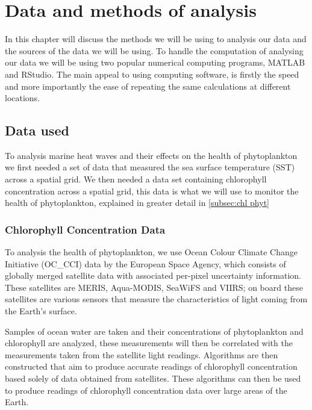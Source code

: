 {\let\clearpage\relax \chapter{Data and methods of analysis}}

In this chapter will discuss the methods we will be using to analysis our data and the sources of the data we will be using. To handle the computation of analysing our data we will be using two popular numerical computing programs, \textsc{MATLAB} and RStudio. The main appeal to using computing software, is firstly the speed and more importantly the ease of repeating the same calculations at different locations.

\section{Data used}

To analysis marine heat waves and their effects on the health of phytoplankton we first needed a set of data that measured the sea surface temperature (SST) across a spatial grid. We then needed a data set containing chlorophyll concentration across a spatial grid, this data is what we will use to monitor the health of phytoplankton, explained in greater detail in \autoref{subsec:chl phyt}

\subsection{Chlorophyll Concentration Data}

To analysis the health of phytoplankton, we use Ocean Colour Climate Change Initiative (OC\_CCI) \cite{ESA} data by the European Space Agency, which consists of globally merged satellite data with associated per-pixel uncertainty information. These satellites are MERIS, Aqua-MODIS, SeaWiFS and VIIRS; on board these satellites are various sensors that measure the characteristics of light coming from the Earth's surface.

Samples of ocean water are taken and their concentrations of phytoplankton and chlorophyll are analyzed, these measurements will then be correlated with the measurements taken from the satellite light readings. Algorithms are then constructed that aim to produce accurate readings of chlorophyll concentration based solely of data obtained from satellites. These algorithms can then be used to produce readings of chlorophyll concentration data over large areas of the Earth.

